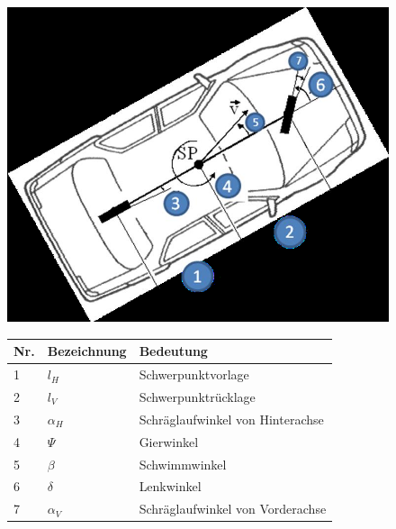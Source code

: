 \begin{figure}[H]
    \centering
    \begin{minipage}[c]{.24\linewidth}
        \centering
        \includegraphics[width=\linewidth]{Graphics/Linearen_Einspurmodell.png}
    \end{minipage}
    \begin{minipage}[c]{.75\linewidth}
        \centering
        \begin{tabular}{|p{.05\linewidth}<{\centering}|p{.115\linewidth}<{\centering}|p{.75\linewidth}<{\centering}|}
            \hline
            Nr. & Bezeichnung & Bedeutung                        \\
            \hline
            1   & $l_H$       & Schwerpunktvorlage               \\
            \hline
            2   & $l_V$       & Schwerpunktr\"ucklage            \\
            \hline
            3   & $\alpha_H$  & Schräglaufwinkel von Hinterachse \\
            \hline
            4   & $\Psi$      & Gierwinkel                       \\
            \hline
            5   & $\beta$     & Schwimmwinkel                    \\
            \hline
            6   & $\delta$    & Lenkwinkel                       \\
            \hline
            7   & $\alpha_V$  & Schräglaufwinkel von Vorderachse \\
            \hline
        \end{tabular}
    \end{minipage}
\end{figure}

